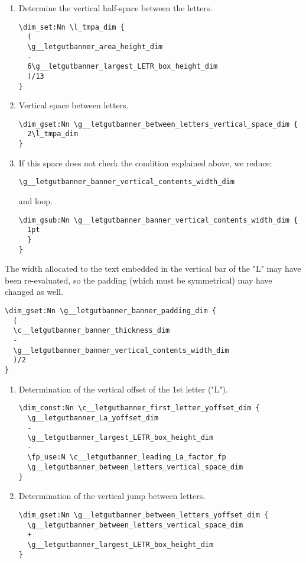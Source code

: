 \documentclass{letgut}
\begin{document}
\begin{enumerate}
\item Determine the vertical half-space between the letters.
\begin{lstlisting}
\dim_set:Nn \l_tmpa_dim {
  (
  \g__letgutbanner_area_height_dim
  -
  6\g__letgutbanner_largest_LETR_box_height_dim
  )/13
}
\end{lstlisting}
\item Vertical space between letters.
\begin{lstlisting}
\dim_gset:Nn \g__letgutbanner_between_letters_vertical_space_dim {
  2\l_tmpa_dim
}
\end{lstlisting}
\item If this space does not check the condition explained above, we reduce:

\lstinline+\g__letgutbanner_banner_vertical_contents_width_dim+

and loop.
\begin{lstlisting}
\dim_gsub:Nn \g__letgutbanner_banner_vertical_contents_width_dim {
  1pt
  }
}
\end{lstlisting}
\end{enumerate}
The width allocated to the text embedded in the vertical bar of the "L" may have
been re-evaluated, so the padding (which must be symmetrical) may have changed
as well.
\begin{lstlisting}
\dim_gset:Nn \g__letgutbanner_banner_padding_dim {
  (
  \c__letgutbanner_banner_thickness_dim
  -
  \g__letgutbanner_banner_vertical_contents_width_dim
  )/2
}
\end{lstlisting}
\begin{enumerate}
\item Determination of the vertical offset of the 1st letter ("L").
\begin{lstlisting}
\dim_const:Nn \c__letgutbanner_first_letter_yoffset_dim {
  \g__letgutbanner_La_yoffset_dim
  -
  \g__letgutbanner_largest_LETR_box_height_dim
  -
  \fp_use:N \c__letgutbanner_leading_La_factor_fp
  \g__letgutbanner_between_letters_vertical_space_dim
}
\end{lstlisting}
\item Determination of the vertical jump between letters.
\begin{lstlisting}
\dim_gset:Nn \g__letgutbanner_between_letters_yoffset_dim {
  \g__letgutbanner_between_letters_vertical_space_dim
  +
  \g__letgutbanner_largest_LETR_box_height_dim
}
\end{lstlisting}
\end{enumerate}
\end{document}

